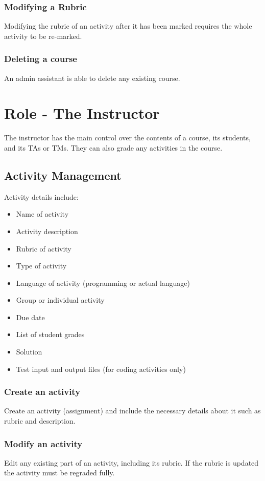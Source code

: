 \documentclass{article}
\begin{document}
\subsubsection{Modifying a Rubric}
Modifying the rubric of an activity after it has been marked requires the whole
activity to be re-marked.
\subsubsection{Deleting a course}
An admin assistant is able to delete any existing course.

\section{Role - The Instructor \label{Instructor}}
The instructor has the main control over the contents of a course, its students, 
and its TAs or TMs. They can also grade any activities in the course.
\subsection{Activity Management}
Activity details include:
\begin {itemize}
	\item Name of activity
	\item Activity description
	\item Rubric of activity
	\item Type of activity
	\item Language of activity (programming or actual language)
	\item Group or individual activity
	\item Due date
	\item List of student grades
	\item Solution
	\item Test input and output files (for coding activities only)
\end {itemize}
\subsubsection{Create an activity}
Create an activity (assignment) and include the necessary details about it such 
as rubric and description.
\subsubsection{Modify an activity}
Edit any existing part of an activity, including its rubric. If the rubric is updated
the activity must be regraded fully.
\end{document}
